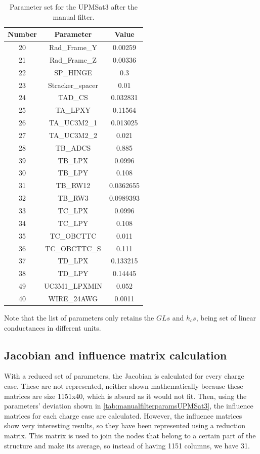     \begin{table}[H]
        \centering
        \caption{Parameter set for the UPMSat3 after the manual filter.}
        \label{tab:manualfilterparamsUPMSat3-2}
    \begin{tabular}{ccc}
        \hline
        Number & Parameter & Value \\
        \hline
    20 & Rad\_Frame\_Y & 0.00259 \\
    21 & Rad\_Frame\_Z & 0.00336 \\
    22 & SP\_HINGE & 0.3 \\
    23 & Stracker\_spacer & 0.01 \\
    24 & TAD\_CS & 0.032831 \\
    25 & TA\_LPXY & 0.11564 \\
    26 & TA\_UC3M2\_1 & 0.013025 \\
    27 & TA\_UC3M2\_2 & 0.021 \\
    28 & TB\_ADCS & 0.885 \\
    39 & TB\_LPX & 0.0996 \\
    30 & TB\_LPY & 0.108 \\
    31 & TB\_RW12 & 0.0362655 \\
    32 & TB\_RW3 & 0.0989393 \\
    33 & TC\_LPX & 0.0996 \\
    34 & TC\_LPY & 0.108 \\
    35 & TC\_OBCTTC & 0.011 \\
    36 & TC\_OBCTTC\_S & 0.111 \\
    37 & TD\_LPX & 0.133215 \\
    38 & TD\_LPY & 0.14445 \\
    49 & UC3M1\_LPXMIN & 0.052   \\
    40 & WIRE\_24AWG & 0.0011  \\

    \bottomrule
    \end{tabular}
\end{table}
Note that the list of parameters only retains the $GLs$ and $h_cs$, being set of linear conductances in different units.

\subsection{Jacobian and influence matrix calculation}
With a reduced set of parameters, the Jacobian is calculated for every charge case. These are not represented, neither shown mathematically because these matrices are size 1151x40, which is absurd as it would not fit. Then, using the parameters' deviation shown in \autoref{tab:manualfilterparamsUPMSat3}, the influence matrices for each charge case are calculated. However, the influence matrices show very interesting results, so they have been represented using a reduction matrix. This matrix is used to join the nodes that belong to a certain part of the structure and make its average, so instead of having 1151 columns, we have 31.

